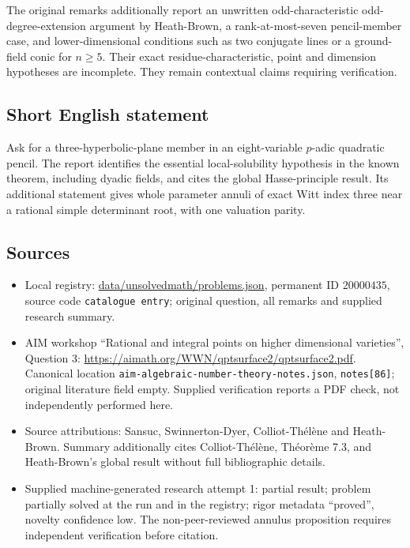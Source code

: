 \documentclass[11pt]{article}
\begin{document}
The original remarks additionally report an unwritten odd-characteristic odd-degree-extension argument by Heath-Brown, a rank-at-most-seven pencil-member case, and lower-dimensional conditions such as two conjugate lines or a ground-field conic for $n\geq5$. Their exact residue-characteristic, point and dimension hypotheses are incomplete. They remain contextual claims requiring verification.
\subsection{Short English statement}
Ask for a three-hyperbolic-plane member in an eight-variable $p$-adic quadratic pencil. The report identifies the essential local-solubility hypothesis in the known theorem, including dyadic fields, and cites the global Hasse-principle result. Its additional statement gives whole parameter annuli of exact Witt index three near a rational simple determinant root, with one valuation parity.
\subsection{Sources}
\begin{itemize}
\item Local registry: \url{data/unsolvedmath/problems.json}, permanent ID $20000435$, source code \texttt{catalogue entry}; original question, all remarks and supplied research summary.
\item AIM workshop ``Rational and integral points on higher dimensional varieties'', Question 3: \url{https://aimath.org/WWN/qptsurface2/qptsurface2.pdf}. Canonical location \texttt{aim-algebraic-number-theory-notes.json}, \texttt{notes[86]}; original literature field empty. Supplied verification reports a PDF check, not independently performed here.
\item Source attributions: Sansuc, Swinnerton-Dyer, Colliot-Th\'el\`ene and Heath-Brown. Summary additionally cites Colliot-Th\'el\`ene, Th\'eor\`eme 7.3, and Heath-Brown's global result without full bibliographic details.
\item Supplied machine-generated research attempt 1: partial result; problem partially solved at the run and in the registry; rigor metadata ``proved'', novelty confidence low. The non-peer-reviewed annulus proposition requires independent verification before citation.
\end{itemize}
\end{document}
